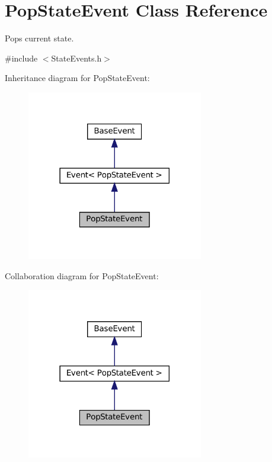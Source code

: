 \hypertarget{classPopStateEvent}{}\section{Pop\+State\+Event Class Reference}
\label{classPopStateEvent}


Pops current state.  




{\ttfamily \#include $<$State\+Events.\+h$>$}



Inheritance diagram for Pop\+State\+Event\+:\nopagebreak
\begin{figure}[H]
\begin{center}
\leavevmode
\includegraphics[width=218pt]{classPopStateEvent__inherit__graph}
\end{center}
\end{figure}


Collaboration diagram for Pop\+State\+Event\+:\nopagebreak
\begin{figure}[H]
\begin{center}
\leavevmode
\includegraphics[width=218pt]{classPopStateEvent__coll__graph}
\end{center}
\end{figure}
